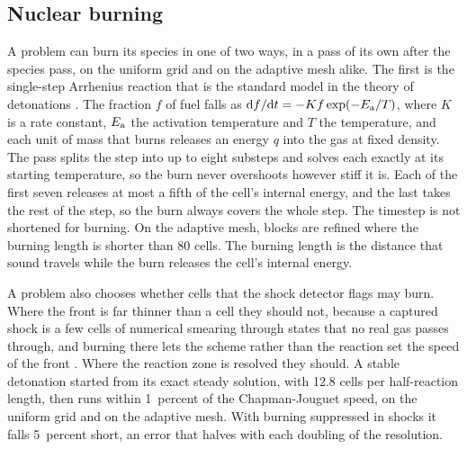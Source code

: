 \documentclass[twocolumn]{aastex701}
\begin{document}
\subsection{Nuclear burning}
\label{sec:burning}

A problem can burn its species in one of two ways, in a pass of its own after the species pass, on the uniform grid and on the adaptive mesh alike. The first is the single-step Arrhenius reaction that is the standard model in the theory of detonations \citep{Fickett1979}. The fraction $f$ of fuel falls as $\mathrm{d}f/\mathrm{d}t = -K f\exp(-E_{\rm a}/T)$, where $K$ is a rate constant, $E_{\rm a}$ the activation temperature and $T$ the temperature, and each unit of mass that burns releases an energy $q$ into the gas at fixed density. The pass splits the step into up to eight substeps and solves each exactly at its starting temperature, so the burn never overshoots however stiff it is. Each of the first seven releases at most a fifth of the cell's internal energy, and the last takes the rest of the step, so the burn always covers the whole step. The timestep is not shortened for burning. On the adaptive mesh, blocks are refined where the burning length is shorter than 80 cells. The burning length is the distance that sound travels while the burn releases the cell's internal energy.

A problem also chooses whether cells that the shock detector flags may burn. Where the front is far thinner than a cell they should not, because a captured shock is a few cells of numerical smearing through states that no real gas passes through, and burning there lets the scheme rather than the reaction set the speed of the front \citep{Colella1986}. Where the reaction zone is resolved they should. A stable detonation started from its exact steady solution, with 12.8 cells per half-reaction length, then runs within 1~percent of the Chapman-Jouguet speed, on the uniform grid and on the adaptive mesh. With burning suppressed in shocks it falls 5~percent short, an error that halves with each doubling of the resolution.
\end{document}
